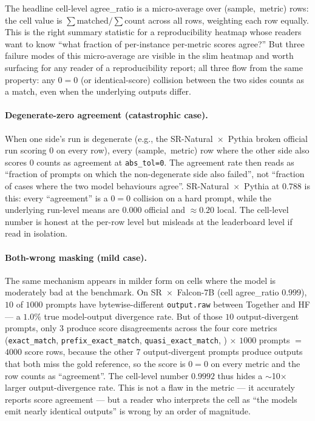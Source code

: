 The headline cell-level agree\_ratio is a micro-average over
  \mbox{(sample, metric)} rows: the cell value is $\sum
  \text{matched} / \sum \text{count}$ across all rows, weighting each
  row equally.
This is the right summary statistic for a reproducibility heatmap
  whose readers want to know ``what fraction of per-instance
  per-metric scores agree?''
But three failure modes of this micro-average are visible in the slim
  heatmap and worth surfacing for any reader of a reproducibility
  report; all three flow from the same property: any $0=0$ (or
  identical-score) collision between the two sides counts as a match,
  even when the underlying outputs differ.

\paragraph{Degenerate-zero agreement (catastrophic case).}
When one side's run is degenerate
  (e.g., the SR-Natural~$\times$~Pythia broken official run scoring
  $0$ on every row), every \mbox{(sample, metric)} row where the
  other side also scores $0$ counts as agreement at \texttt{abs\_tol=0}.
The agreement rate then reads as ``fraction of prompts on which the
  non-degenerate side also failed'', not ``fraction of cases where
  the two model behaviours agree''.
SR-Natural~$\times$~Pythia at $0.788$ is this: every ``agreement''
  is a $0=0$ collision on a hard prompt, while the underlying
  run-level means are $0.000$ official and $\approx 0.20$ local.
The cell-level number is honest at the per-row level but misleads
  at the leaderboard level if read in isolation.

\paragraph{Both-wrong masking (mild case).}
The same mechanism appears in milder form on cells where the model
  is moderately bad at the benchmark.
On SR~$\times$~Falcon-7B (cell agree\_ratio $0.999$), $10$ of $1000$
  prompts have bytewise-different \texttt{output.raw} between Together
  and HF — a $1.0\%$ true model-output divergence rate.
But of those $10$ output-divergent prompts, only $3$ produce score
  disagreements across the four core metrics
  (\texttt{exact\_match}, \texttt{prefix\_exact\_match},
  \texttt{quasi\_exact\_match}, )
  $\times$ $1000$ prompts $=$ $4000$ score rows, because the other $7$
  output-divergent prompts produce outputs that both miss the gold
  reference, so the score is $0=0$ on every metric and the row counts
  as ``agreement''.
The cell-level number $0.9992$ thus hides a $\sim$10$\times$ larger
  output-divergence rate.
This is not a flaw in the metric — it accurately reports score
  agreement — but a reader who interprets the cell as ``the models
  emit nearly identical outputs'' is wrong by an order of magnitude.

